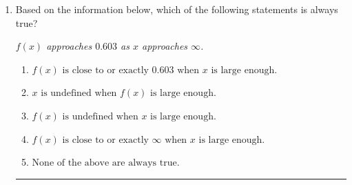 \documentclass[14pt]{extbook}
\newcommand{\litem}[1]{\item#1\hspace*{-1cm}\rule{\textwidth}{0.4pt}}
\begin{document}
\begin{enumerate}
{\begin{enumerate}[label=\Alph*.]
\end{enumerate} }
\litem{
Based on the information below, which of the following statements is always true?
\begin{center}
    \textit{ $f(x)$ approaches $0.603$ as $x$ approaches $\infty$. }
\end{center}
\begin{enumerate}[label=\Alph*.]
\item \( f(x) \text{ is close to or exactly } 0.603 \text{ when } x \text{ is large enough}. \)
\item \( x \text{ is undefined when } f(x) \text{ is large enough}. \)
\item \( f(x) \text{ is undefined when } x \text{ is large enough}. \)
\item \( f(x) \text{ is close to or exactly } \infty \text{ when } x \text{ is large enough}. \)
\item \( \text{None of the above are always true.} \)

\end{enumerate} }
\end{enumerate}
\end{document}
